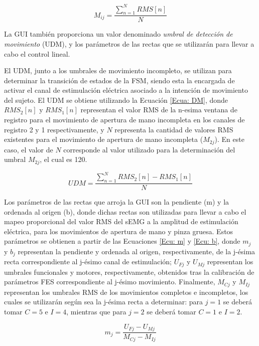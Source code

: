 \begin{equation}
	M_{ij} = \frac{\sum_{n=1}^{N}RMS[n]}{N}
	\label{Ecu: U_RMS}
\end{equation}

La GUI también proporciona un valor denominado \emph{umbral de detección de movimiento} (UDM), y los parámetros de las rectas que se utilizarán para llevar a cabo el control lineal.

El UDM, junto a los umbrales de movimiento incompleto, se utilizan para determinar la transición de estados de la FSM, siendo esta la encargada de activar el canal de estimulación eléctrica asociado a la intención de movimiento del sujeto. El UDM se obtiene utilizando la Ecuación \ref{Ecua: DM}, donde $RMS_{2}[n]$ y $RMS_{1}[n]$ representan el valor RMS de la n-esima ventana de registro para el movimiento de apertura de mano incompleta en los canales de registro 2 y 1 respectivamente, y $N$ representa la cantidad de valores RMS existentes para el movimiento de apertura de mano incompleta ($M_{2j}$). En este caso, el valor de $N$ corresponde al valor utilizado para la determinación del umbral $M_{2j}$, el cual es 120.

\begin{equation}
	UDM = \frac{\sum_{n=1}^{N}RMS_{2}[n]-RMS_{1}[n]}{N}
	\label{Ecua: DM}
\end{equation}

Los parámetros de las rectas que arroja la GUI son la pendiente (m) y la ordenada al origen (b), donde dichas rectas son utilizadas para llevar a cabo el mapeo proporcional del valor RMS del sEMG a la amplitud de estimulación eléctrica, para los movimientos de apertura de mano y pinza gruesa. Estos parámetros se obtienen a partir de las Ecuaciones \ref{Ecu: m} y \ref{Ecu: b}, donde $m_{j}$ y $b_{j}$ representan la pendiente y ordenada al origen, respectivamente, de la j-ésima recta correspondiente al j-ésimo canal de estimulación; $U_{Fj}$ y $U_{Mj}$ representan los umbrales funcionales y motores, respectivamente, obtenidos tras la calibración de parámetros FES correspondiente al j-ésimo movimiento. Finalmente, $M_{Cj}$ y $M_{Ij}$ representan los umbrales RMS de los movimientos completos e incompletos, los cuales se utilizarán según sea la j-ésima recta a determinar: para $j=1$ se deberá tomar $C=5$ e $I=4$, mientras que para $j=2$ se deberá tomar $C=1$ e $I=2$.

\vfill
\begin{equation}
	m_{j} = \frac{ U_{Fj} - U_{Mj} }{ M_{Cj} - M_{Ij} }
	\label{Ecu: m}
\end{equation}

